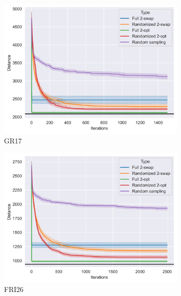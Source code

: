 \documentclass{article}
\begin{document}
\begin{figure}[h]
    \begin{subfigure}[b]{0.33\textwidth}
        \includegraphics[width=\textwidth]{images/gr17_plot.png}
        \caption{GR17}
    \end{subfigure}
    \hfill
    \begin{subfigure}[b]{0.33\textwidth}
        \includegraphics[width=\textwidth]{images/fri26_plot.png}
        \caption{FRI26}
    \end{subfigure}
    \hfill
    \begin{subfigure}[b]{0.33\textwidth}

\end{subfigure}
\end{figure}
\end{document}
